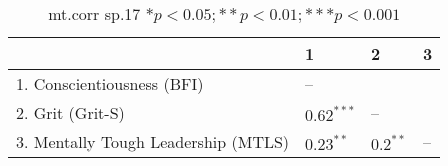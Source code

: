 \begin{table}[ht]
\centering
\begin{tabular}{llll}
  \hline
 & 1 & 2 & 3 \\ 
  \hline
1. Conscientiousness (BFI) & -- &  &  \\ 
  2. Grit (Grit-S) & $0.62^{***}$ & -- &  \\ 
  3. Mentally Tough Leadership (MTLS) & $0.23^{**}$ & $0.2^{**}$ & -- \\ 
   \hline
\end{tabular}
\caption{mt.corr sp.17 $* p < 0.05; ** p < 0.01; *** p < 0.001$} 
\label{freq_corr.mt.corr.sp.17}
\end{table}
